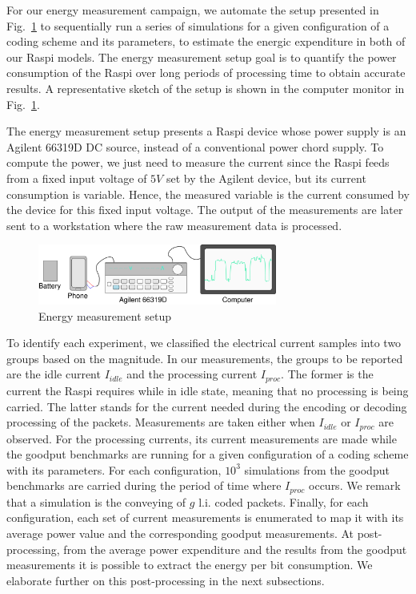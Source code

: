 For our energy measurement campaign, we automate the setup presented
in Fig.~\ref{fig:measurement_setup} to sequentially run a series of
simulations for a given configuration of a coding scheme and its parameters,
to estimate the energic expenditure in both of our \ac{Raspi}
models. The energy measurement setup goal is to quantify the power
consumption of the \ac{Raspi} over long periods of processing time to
obtain accurate results. A representative sketch of the setup is shown
in the computer monitor in Fig.~\ref{fig:measurement_setup}.

The energy measurement setup presents a \ac{Raspi} device whose power
supply is an Agilent 66319D \ac{DC} source, instead of a conventional
power chord supply.   To compute the power, we just need to measure
the current since the \ac{Raspi} feeds from a fixed input voltage of $5V$
set by the Agilent device, but its current consumption is variable.
Hence, the measured variable is the current consumed by the device for
this fixed input voltage. The output of the measurements
are later sent to a workstation where the raw measurement data is processed.

\begin{figure}[ht!]
\centering
\includegraphics[width=0.7\textwidth]{images/measurement_setup.eps}
\caption{Energy measurement setup}
\label{fig:measurement_setup}
\end{figure}

To identify each experiment, we classified the electrical current samples
into two groups based on the magnitude. In our measurements, the groups to
be reported are the idle current $I_{idle}$ and the processing current
$I_{proc}$. The former is the current the \ac{Raspi} requires while in idle
state, meaning that no processing is being carried. The latter stands for
the current needed during the encoding or decoding processing of the packets.
Measurements are taken either when $I_{idle}$ or $I_{proc}$ are observed.
For the processing currents, its current measurements are made while the
goodput benchmarks are running for a given configuration of a coding scheme
with its parameters. For each configuration, $10^3$ simulations from the
goodput benchmarks are carried during the period of time where $I_{proc}$
occurs. We remark that a simulation is the conveying of $g$ \ac{l.i.} coded
packets. Finally, for each configuration, each set of current measurements is
enumerated to map it with its average power value and the corresponding goodput
measurements. At post-processing, from the average power expenditure and the
results from the goodput measurements it is possible to extract the energy
per bit consumption. We elaborate further on this post-processing in the
next subsections.

